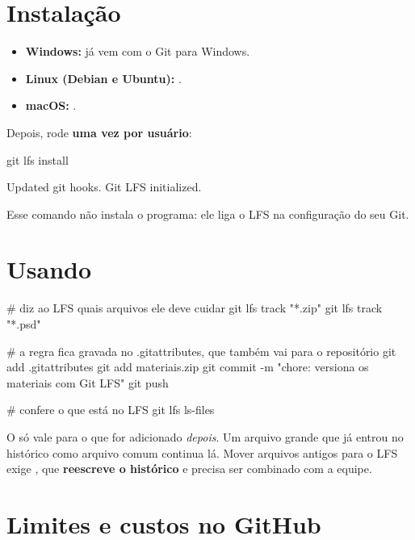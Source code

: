\section{Instalação}

\begin{itemize}
  \item \textbf{Windows:} já vem com o Git para Windows.
  \item \textbf{Linux (Debian e Ubuntu):} .
  \item \textbf{macOS:} .
\end{itemize}

Depois, rode \textbf{uma vez por usuário}:

\begin{bashcode}
git lfs install
\end{bashcode}

\begin{saida}
Updated git hooks.
Git LFS initialized.
\end{saida}

Esse comando não instala o programa: ele liga o LFS na configuração do seu
Git.

\section{Usando}

\begin{bashcode}
# diz ao LFS quais arquivos ele deve cuidar
git lfs track "*.zip"
git lfs track "*.psd"

# a regra fica gravada no .gitattributes, que também vai para o repositório
git add .gitattributes
git add materiais.zip
git commit -m "chore: versiona os materiais com Git LFS"
git push

# confere o que está no LFS
git lfs ls-files
\end{bashcode}

\begin{aviso}
O  só vale para o que for adicionado \emph{depois}. Um
arquivo grande que já entrou no histórico como arquivo comum continua lá.
Mover arquivos antigos para o LFS exige , que
\textbf{reescreve o histórico} e precisa ser combinado com a equipe.
\end{aviso}

\section{Limites e custos no GitHub}

